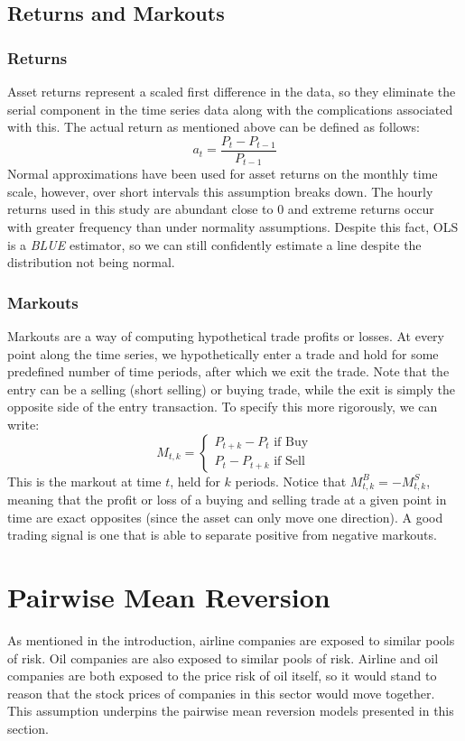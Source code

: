 \documentclass{article}
\begin{document}
\subsection{Returns and Markouts}
\subsubsection{Returns}
Asset returns represent 
a scaled first difference in the data, so they eliminate the serial component in the 
time series data along with the complications associated with this. The actual return 
as mentioned above can be defined as follows:
$$a_t = \frac{P_t - P_{t-1}}{P_{t-1}}$$
Normal approximations
have been used for asset returns on the monthly time scale, however, over short intervals this
assumption breaks down. The hourly returns used in this study are abundant close to 0 and 
extreme returns occur with greater frequency than under normality assumptions.
Despite this fact, OLS is a \textit{BLUE} estimator, so we can still confidently estimate 
a line despite the distribution not being normal. 
\subsubsection{Markouts}
Markouts are a way of computing hypothetical trade profits or losses. At every point along the
time series, we hypothetically enter a trade and hold for some predefined number of time 
periods, after which we exit the trade. Note that the entry can be a selling (short selling)
or buying trade, while the exit is simply the opposite side of the entry transaction. To 
specify this more rigorously, we can write:
$$M_{t,k} = \begin{cases} 
P_{t+k} - P_t \text { if Buy}\\
P_t - P_{t+k} \text { if Sell}
\end{cases}$$
This is the markout at time $t$, held for $k$ periods. Notice that $M^B_{t,k} = -M^S_{t,k}$,
meaning that the profit or loss of a buying and selling trade at a given point in time are 
exact opposites (since the asset can only move one direction). A good trading signal is one
that is able to separate positive from negative markouts. 

\section{Pairwise Mean Reversion}
As mentioned in the introduction, airline companies are exposed to similar pools of
risk. Oil companies are also exposed to similar pools of risk. Airline and oil companies
are both exposed to the price risk of oil itself, so it would stand to reason that the
stock prices of companies in this sector would move together. This assumption underpins
the pairwise mean reversion models presented in this section.
\end{document}

